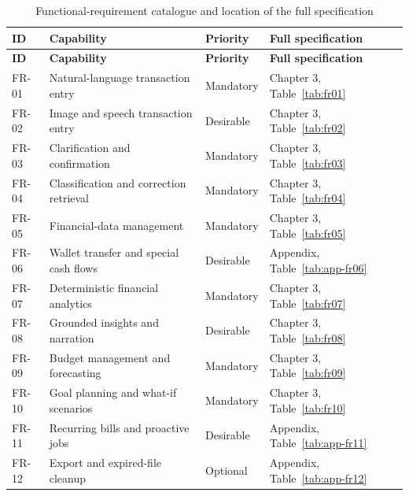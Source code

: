\begin{longtable}{@{}L{1.5cm}L{5.0cm}L{3.0cm}L{4.5cm}@{}}
  \caption{Functional-requirement catalogue and location of the full specification}
  \label{tab:fr-catalogue}\\
  \toprule
  \textbf{ID} & \textbf{Capability} & \textbf{Priority} & \textbf{Full specification} \\
  \midrule
  \endfirsthead
  \toprule
  \textbf{ID} & \textbf{Capability} & \textbf{Priority} & \textbf{Full specification} \\
  \midrule
  \endhead
  FR-01 & Natural-language transaction entry & Mandatory & Chapter 3, Table~\ref{tab:fr01} \\
  FR-02 & Image and speech transaction entry & Desirable & Chapter 3, Table~\ref{tab:fr02} \\
  FR-03 & Clarification and confirmation & Mandatory & Chapter 3, Table~\ref{tab:fr03} \\
  FR-04 & Classification and correction retrieval & Mandatory & Chapter 3, Table~\ref{tab:fr04} \\
  FR-05 & Financial-data management & Mandatory & Chapter 3, Table~\ref{tab:fr05} \\
  FR-06 & Wallet transfer and special cash flows & Desirable & Appendix, Table~\ref{tab:app-fr06} \\
  FR-07 & Deterministic financial analytics & Mandatory & Chapter 3, Table~\ref{tab:fr07} \\
  FR-08 & Grounded insights and narration & Desirable & Chapter 3, Table~\ref{tab:fr08} \\
  FR-09 & Budget management and forecasting & Mandatory & Chapter 3, Table~\ref{tab:fr09} \\
  FR-10 & Goal planning and what-if scenarios & Mandatory & Chapter 3, Table~\ref{tab:fr10} \\
  FR-11 & Recurring bills and proactive jobs & Desirable & Appendix, Table~\ref{tab:app-fr11} \\
  FR-12 & Export and expired-file cleanup & Optional & Appendix, Table~\ref{tab:app-fr12} \\
  \bottomrule
\end{longtable}

